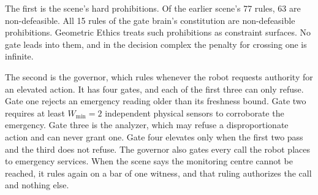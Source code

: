 The first is the scene's hard prohibitions. Of the earlier scene's 77 rules, 63 are
non-defeasible. All 15 rules of the gate brain's constitution are non-defeasible prohibitions.
Geometric Ethics treats such prohibitions as constraint surfaces. No gate leads into them, and in
the decision complex the penalty for crossing one is infinite.

The second is the governor, which rules whenever the robot requests authority for an elevated action. It has four gates, and each of
the first three can only refuse. Gate one rejects an emergency reading older than its freshness
bound. Gate two requires at least $W_{\min} = 2$ independent physical sensors to corroborate the
emergency. Gate three is the analyzer, which may refuse a disproportionate action and can never
grant one. Gate four elevates only when the first two pass and the third does not refuse.
The governor also gates every call the robot places to emergency services. When the scene says
the monitoring centre cannot be reached, it rules again on a bar of one witness, and that ruling
authorizes the call and nothing else.

